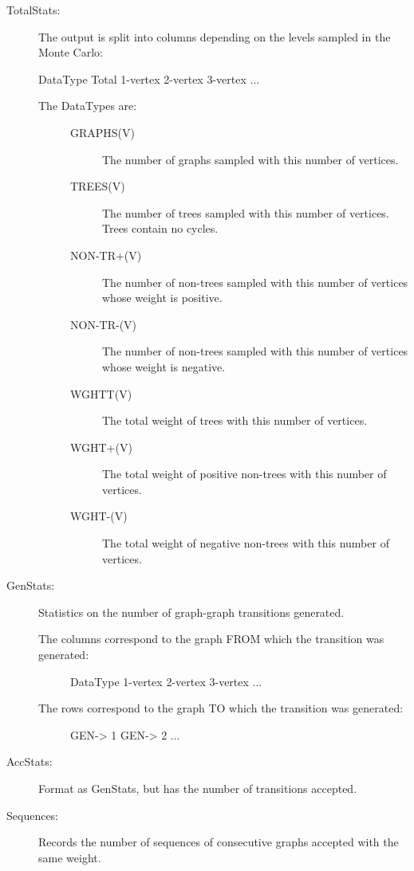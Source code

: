 \documentclass[openany,a4paper,10pt,english]{manual}
\begin{document}
\begin{description}
\item[TotalStats:] \leavevmode
The output is split into columns depending on the levels sampled in the Monte Carlo:

DataType    Total    1-vertex    2-vertex    3-vertex    ...
\begin{description}
\item[The DataTypes are:] \leavevmode\begin{description}
\item[GRAPHS(V)] \leavevmode
The number of graphs sampled with this number of vertices.

\item[TREES(V)] \leavevmode
The number of trees sampled with this number of vertices.  Trees contain no cycles.

\item[NON-TR+(V)] \leavevmode
The number of non-trees sampled with this number of vertices whose weight is positive.

\item[NON-TR-(V)] \leavevmode
The number of non-trees sampled with this number of vertices whose weight is negative.

\item[WGHTT(V)] \leavevmode
The total weight of trees with this number of vertices.

\item[WGHT+(V)] \leavevmode
The total weight of positive non-trees with this number of vertices.

\item[WGHT-(V)] \leavevmode
The total weight of negative non-trees with this number of vertices.

\end{description}

\end{description}

\item[GenStats:] \leavevmode
Statistics on the number of graph-graph transitions generated.
\begin{description}
\item[The columns correspond to the graph FROM which the transition was generated:] \leavevmode
DataType    1-vertex    2-vertex    3-vertex    ...

\item[The rows correspond to the graph TO which the transition was generated:] \leavevmode
GEN-\textgreater{} 1
GEN-\textgreater{} 2
...

\end{description}

\item[AccStats:] \leavevmode
Format as GenStats, but has the number of transitions accepted.

\item[Sequences:] \leavevmode
Records the number of sequences of consecutive graphs accepted with the same weight.

\end{description}
\end{document}
